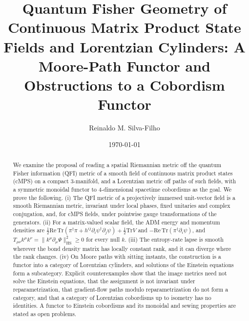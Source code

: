 \documentclass[11pt,a4paper,reqno]{amsart}
\theoremstyle{definition}
\numberwithin{equation}{section}
\newcommand{\Tr}{\mathrm{Tr}}
\newcommand{\HS}{\mathrm{HS}}
\begin{document}
\title[Quantum Fisher Geometry of cMPS Fields and Lorentzian Cylinders]{Quantum Fisher Geometry of Continuous Matrix Product State Fields and Lorentzian Cylinders: A Moore-Path Functor and Obstructions to a Cobordism Functor}

\author{Reinaldo M. Silva-Filho}
\address{Master's student, Postgraduate Program in Statistics and Agricultural Experimentation (PPGEE/DES), Department of Statistics (DES), Federal University of Lavras (UFLA), Lavras, MG, Brazil}

\date{\today}

\begin{abstract}
We examine the proposal of reading a spatial Riemannian metric off the quantum Fisher information (QFI) metric of a smooth field of continuous matrix product states (cMPS) on a compact 3-manifold, and a Lorentzian metric off paths of such fields, with a symmetric monoidal functor to 4-dimensional spacetime cobordisms as the goal. We prove the following. (i) The QFI metric of a projectively immersed unit-vector field is a smooth Riemannian metric, invariant under local phases, fixed unitaries and complex conjugation, and, for cMPS fields, under pointwise gauge transformations of the generators. (ii) For a matrix-valued scalar field, the ADM energy and momentum densities are $\tfrac12\mathrm{Re}\,\Tr(\pi^\dagger\pi+h^{ij}\partial_i\psi^\dagger\partial_j\psi)+\tfrac12\Tr V$ and $-\mathrm{Re}\,\Tr(\pi^\dagger\partial_i\psi)$, and $T_{\mu\nu}k^\mu k^\nu=\|k^\mu\partial_\mu\Psi\|_{\HS}^2\ge 0$ for every null $k$. (iii) The entropy-rate lapse is smooth wherever the bond density matrix has locally constant rank, and it can diverge where the rank changes. (iv) On Moore paths with sitting instants, the construction is a functor into a category of Lorentzian cylinders, and solutions of the Einstein equations form a subcategory. Explicit counterexamples show that the image metrics need not solve the Einstein equations, that the assignment is not invariant under reparametrization, that gradient-flow paths modulo reparametrization do not form a category, and that a category of Lorentzian cobordisms up to isometry has no identities. A functor to Einstein cobordisms and its monoidal and sewing properties are stated as open problems.
\end{abstract}

\maketitle
\end{document}
